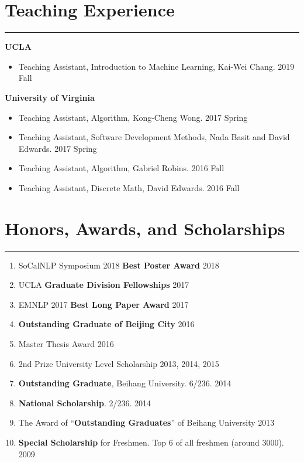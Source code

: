 \documentclass[11pt, a4paper]{article}
\newcommand{\hr}{\hrule\vspace{0.5em}}
\begin{document}
\section*{Teaching Experience}
\hr
\textbf{UCLA}
\begin{itemize}
	\item Teaching Assistant, Introduction to Machine Learning, Kai-Wei Chang. 2019 Fall
\end{itemize}
\textbf{University of Virginia}
\begin{itemize}
\item Teaching Assistant, Algorithm, Kong-Cheng Wong. 2017 Spring
\item Teaching Assistant, Software Development Methods, Nada Basit and David Edwards. 2017 Spring
\item Teaching Assistant, Algorithm, Gabriel Robins. 2016 Fall
\item Teaching Assistant, Discrete Math, David Edwards. 2016 Fall
\end{itemize}

\section*{Honors, Awards, and Scholarships}
\hr
\begin{enumerate}
\item SoCalNLP Symposium 2018 \textbf{Best Poster Award} \hfill 2018
\item UCLA \textbf{Graduate Division Fellowships} \hfill 2017
\item EMNLP 2017 \textbf{Best Long Paper Award} \hfill 2017
\item \textbf{Outstanding Graduate of Beijing City} \hfill 2016
\item Master Thesis Award \hfill 2016
\item 2nd Prize University Level Scholarship \hfill 2013, 2014, 2015
\item \textbf{Outstanding Graduate}, Beihang University. 6/236.	 \hfill 2014
\item \textbf{National Scholarship}. 2/236. \hfill 2014
\item The Award of ``\textbf{Outstanding Graduates}'' of Beihang University \hfill 2013
\item \textbf{Special Scholarship} for Freshmen. Top 6 of all freshmen (around 3000). \hfill 2009

\end{enumerate}
\end{document}
